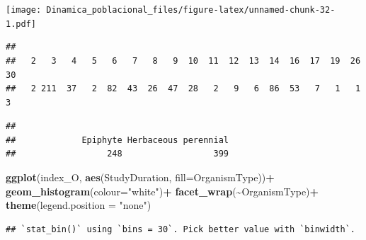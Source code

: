 \documentclass[
]{book}
\newenvironment{Shaded}{\begin{snugshade}}{\end{snugshade}}
\newcommand{\AttributeTok}[1]{\textcolor[rgb]{0.13,0.29,0.53}{#1}}
\newcommand{\FunctionTok}[1]{\textcolor[rgb]{0.13,0.29,0.53}{\textbf{#1}}}
\newcommand{\NormalTok}[1]{#1}
\newcommand{\OtherTok}[1]{\textcolor[rgb]{0.56,0.35,0.01}{#1}}
\newcommand{\SpecialCharTok}[1]{\textcolor[rgb]{0.81,0.36,0.00}{\textbf{#1}}}
\newcommand{\StringTok}[1]{\textcolor[rgb]{0.31,0.60,0.02}{#1}}
\theoremstyle{definition}
\theoremstyle{definition}
\theoremstyle{definition}
\theoremstyle{definition}
\theoremstyle{remark}
\begin{document}
\texttt{[image: Dinamica\_poblacional\_files/figure-latex/unnamed-chunk-32-1.pdf]}

\begin{Shaded}
\end{Shaded}

\begin{verbatim}
## 
##   2   3   4   5   6   7   8   9  10  11  12  13  14  16  17  19  26  30 
##   2 211  37   2  82  43  26  47  28   2   9   6  86  53   7   1   1   3
\end{verbatim}

\begin{Shaded}
\end{Shaded}

\begin{verbatim}
## 
##             Epiphyte Herbaceous perennial 
##                  248                  399
\end{verbatim}

\begin{Shaded}
\begin{Highlighting}[]
\FunctionTok{ggplot}\NormalTok{(index\_O, }\FunctionTok{aes}\NormalTok{(StudyDuration, }\AttributeTok{fill=}\NormalTok{OrganismType))}\SpecialCharTok{+}
         \FunctionTok{geom\_histogram}\NormalTok{(}\AttributeTok{colour=}\StringTok{"white"}\NormalTok{)}\SpecialCharTok{+}
  \FunctionTok{facet\_wrap}\NormalTok{(}\SpecialCharTok{\textasciitilde{}}\NormalTok{OrganismType)}\SpecialCharTok{+}
  \FunctionTok{theme}\NormalTok{(}\AttributeTok{legend.position =} \StringTok{"none"}\NormalTok{)}
\end{Highlighting}
\end{Shaded}

\begin{verbatim}
## `stat_bin()` using `bins = 30`. Pick better value with `binwidth`.
\end{verbatim}
\end{document}
